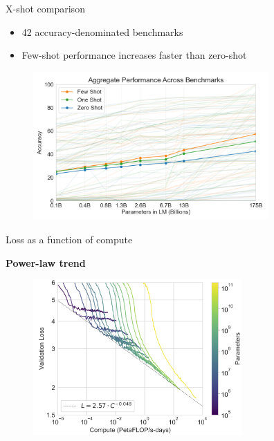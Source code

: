 
\begin{vbframe}{X-shot comparison}
	
	\vfill
	
\begin{itemize}
	\item 42 accuracy-denominated benchmarks
	\item Few-shot performance increases faster than zero-shot
\end{itemize}

	\begin{figure}
		\centering
		\includegraphics[width=9cm]{figure/xshotlargecorpora.png}\\
	\end{figure}
	
	\vfill
	
\end{vbframe}


\begin{vbframe}{Loss as a function of compute}

\vfill

\textbf{Power-law trend}

	\begin{figure}
		\centering
		\includegraphics[width=8cm]{figure/losscompute.png}\\
	\end{figure}

\vfill

\end{vbframe}


\endlecture

